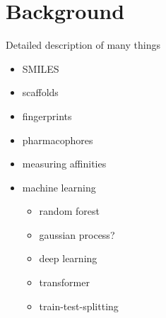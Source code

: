 \chapter{Background} \label{ch:background}

Detailed description of many things

\begin{itemize}
    \item SMILES
    \item scaffolds
    \item fingerprints
    \item pharmacophores
    \item measuring affinities
    \item machine learning
    \begin{itemize}
        \item random forest
        \item gaussian process?
        \item deep learning
        \item transformer
        \item train-test-splitting
    \end{itemize}
    
\end{itemize}